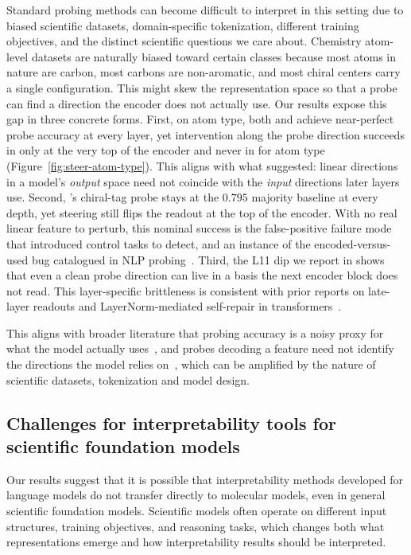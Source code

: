 Standard probing methods can become difficult to interpret in this setting due to biased scientific datasets, domain-specific tokenization, different training objectives, and the distinct scientific questions we care about. Chemistry atom-level datasets are naturally biased toward certain classes because most atoms in nature are carbon, most carbons are non-aromatic, and most chiral centers carry a single configuration. This might skew the representation space so that a probe can find a direction the encoder does not actually use. Our results expose this gap in three concrete forms. First, on atom type, both \molm and \smi achieve near-perfect probe accuracy at every layer, yet intervention along the probe direction succeeds in \molm only at the very top of the encoder and never in \smi for atom type (Figure~\ref{fig:steer-atom-type}). This aligns with what \citet{park2024linear} suggested: linear directions in a model's \emph{output} space need not coincide with the \emph{input} directions later layers use. Second, \molm's chiral-tag probe stays at the $0.795$ majority baseline at every depth, yet steering still flips the readout at the top of the encoder. With no real linear feature to perturb, this nominal success is the false-positive failure mode that \citet{hewitt2019designing} introduced control tasks to detect, and an instance of the encoded-versus-used bug catalogued in NLP probing~\citep{antverg2022pitfalls,elazar2021amnesic}. Third, the L11 dip we report in \smi shows that even a clean probe direction can live in a basis the next encoder block does not read. This layer-specific brittleness is consistent with prior reports on late-layer readouts and LayerNorm-mediated self-repair in transformers~\citep{belrose2023eliciting,heimersheim2024how}. 

This aligns with broader literature that probing accuracy is a noisy
proxy for what the model actually uses~\citep{belinkov2022probing,
pimentel2020information}, and probes decoding a feature need not identify the
directions the model relies on~\citep{lasri2022probing}, which can be amplified
by the nature of scientific datasets, tokenization and model design.

\subsection{Challenges for interpretability tools for scientific foundation models}

Our results suggest that it is possible that interpretability methods developed for language models do not transfer directly to molecular models, even in general scientific foundation models. Scientific models often operate on different input structures, training objectives, and reasoning tasks, which changes both what representations emerge and how interpretability results should be interpreted.

